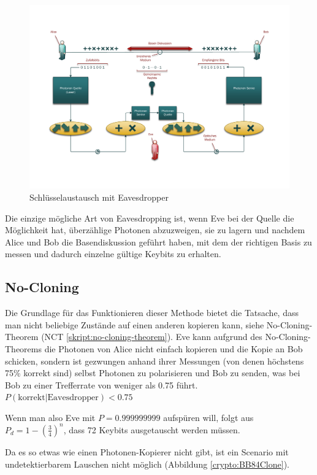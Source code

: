   \begin{figure}
    \centering
    \includegraphics[height=0.45\textheight]{crypto/BB84Eve.pdf}
    \caption{Schl\"usselaustausch mit Eavesdropper\label{crypto:BB84Eve}}
  \end{figure}

  Die einzige m\"ogliche Art von Eavesdropping ist, wenn Eve bei der Quelle die M\"oglichkeit hat, \"uberz\"ahlige Photonen abzuzweigen,
  sie zu lagern und nachdem Alice und Bob die Basendiskussion gef\"uhrt haben,
  mit dem der richtigen Basis zu messen und dadurch einzelne g\"ultige Keybits zu erhalten.

  \subsection{No-Cloning}
  Die Grundlage f\"ur das Funktionieren dieser Methode bietet die Tatsache, dass man nicht beliebige Zust\"ande auf einen anderen kopieren kann, siehe No-Cloning-Theorem (NCT \ref{skript:no-cloning-theorem}).
  Eve kann aufgrund des No-Cloning-Theorems die Photonen von Alice nicht einfach kopieren und die Kopie an Bob schicken,
  sondern ist gezwungen anhand ihrer Messungen (von denen h\"ochstens 75\% korrekt sind) selbst Photonen zu polarisieren
  und Bob zu senden, was bei Bob zu einer Trefferrate von weniger als 0.75 f\"uhrt.
  $P(\text{korrekt}|\text{Eavesdropper})<0.75$

  Wenn man also Eve mit $P=0.999999999$ aufsp\"uren will,
  folgt aus $P_d = 1 - \left(\frac{3}{4}\right)^n$,
  dass 72 Keybits ausgetauscht werden m\"ussen.

  Da es so etwas wie einen Photonen-Kopierer nicht gibt, ist ein Scenario mit undetektierbarem Lauschen nicht m\"oglich (Abbildung \ref{crypto:BB84Clone}).

